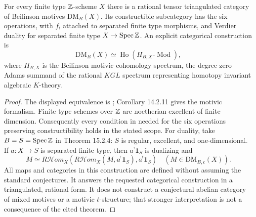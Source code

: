 \begin{theorem}\label{thm:B3-motives}
For every finite type ${\mathbb{Z}}$-scheme $X$ there is a rational tensor
triangulated category of Beilinson motives $\mathrm{DM}_{B}(X)$.
Its constructible subcategory has the six operations, with
$f_!$ attached to separated finite type morphisms, and Verdier
duality for separated finite type $X\to\operatorname{Spec}{\mathbb{Z}}$.
An explicit categorical construction is
\[
 \mathrm{DM}_{B}(X)\simeq
 \operatorname{Ho}(H_{B,X}\text{-}\operatorname{Mod}),
\]
where $H_{B,X}$ is the Beilinson motivic-cohomology spectrum,
the degree-zero Adams summand of the rational $KGL$ spectrum
representing homotopy invariant algebraic $K$-theory.
\end{theorem}
\begin{proof}
The displayed equivalence is
\cite[Theorem 14.2.9]{BCisinskiDeglise}; Corollary 14.2.11 gives the
motivic formalism. Finite type schemes over ${\mathbb{Z}}$ are noetherian
excellent of finite dimension. Consequently every condition in
\cite[Theorem 15.2.1]{BCisinskiDeglise} needed for the six operations
preserving constructibility holds in the stated scope. For duality,
take $B=S=\operatorname{Spec}{\mathbb{Z}}$ in Theorem 15.2.4: $S$ is regular,
excellent, and one-dimensional. If $a:X\to S$ is separated finite
type, then $a^!\mathbf1_S$ is dualizing and
\[
 M\simeq R\mathcal Hom_X(
 R\mathcal Hom_X(M,a^!\mathbf1_S),a^!\mathbf1_S)
 \quad(M\in\mathrm{DM}_{B,c}(X)).
\]
All maps and categories in this construction are defined without
assuming the standard conjectures. It answers the requested
categorical construction in a triangulated, rational form. It does
not construct a conjectural abelian category of mixed motives or
a motivic $t$-structure; that stronger interpretation is not a
consequence of the cited theorem.
\end{proof}

